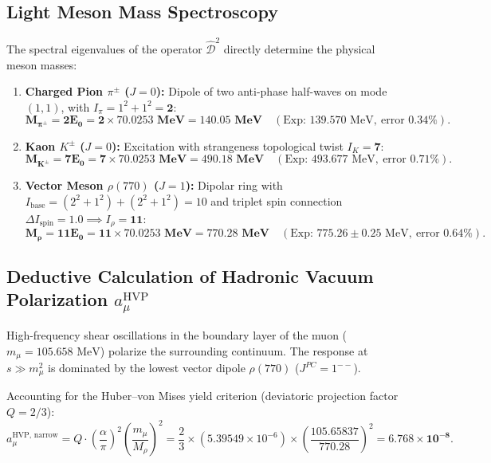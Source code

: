 \documentclass[12pt,a4paper]{article}
\begin{document}
	\subsection{Light Meson Mass Spectroscopy}
	The spectral eigenvalues of the operator $\hat{\mathcal{D}}^2$ directly determine the physical meson masses:
	\begin{enumerate}
		\item \textbf{Charged Pion $\pi^\pm$ ($J=0$):} Dipole of two anti-phase half-waves on mode $(1,1)$, with $I_\pi = 1^2 + 1^2 = \mathbf{2}$:
		\begin{equation}
			\mathbf{M_{\pi^\pm} = 2 E_0 = 2 \times 70.0253 \text{ MeV} = \mathbf{140.05 \text{ MeV}}} \quad (\text{Exp: } 139.570 \text{ MeV}, \ \text{error } 0.34\%).
		\end{equation}
		
		\item \textbf{Kaon $K^\pm$ ($J=0$):} Excitation with strangeness topological twist $I_K = \mathbf{7}$:
		\begin{equation}
			\mathbf{M_{K^\pm} = 7 E_0 = 7 \times 70.0253 \text{ MeV} = \mathbf{490.18 \text{ MeV}}} \quad (\text{Exp: } 493.677 \text{ MeV}, \ \text{error } 0.71\%).
		\end{equation}
		
		\item \textbf{Vector Meson $\rho(770)$ ($J=1$):} Dipolar ring with $I_{\text{base}} = (2^2+1^2) + (2^2+1^2) = 10$ and triplet spin connection $\Delta I_{\text{spin}} = 1.0 \implies I_\rho = \mathbf{11}$:
		\begin{equation}
			\mathbf{M_\rho = 11 E_0 = 11 \times 70.0253 \text{ MeV} = \mathbf{770.28 \text{ MeV}}} \quad (\text{Exp: } 775.26 \pm 0.25 \text{ MeV}, \ \text{error } 0.64\%).
		\end{equation}
	\end{enumerate}
	
	\subsection{Deductive Calculation of Hadronic Vacuum Polarization $a_\mu^{\text{HVP}}$}
	High-frequency shear oscillations in the boundary layer of the muon ($m_\mu = 105.658\text{ MeV}$) polarize the surrounding continuum. The response at $s \gg m_\mu^2$ is dominated by the lowest vector dipole $\rho(770)$ ($J^{PC} = 1^{--}$).
	
	Accounting for the Huber--von Mises yield criterion (deviatoric projection factor $Q = 2/3$):
	\begin{equation}
		a_\mu^{\text{HVP, narrow}} = Q \cdot \left(\frac{\alpha}{\pi}\right)^2 \left(\frac{m_\mu}{M_\rho}\right)^2 = \frac{2}{3} \times (5.39549 \times 10^{-6}) \times \left(\frac{105.65837}{770.28}\right)^2 = \mathbf{6.768 \times 10^{-8}}.
	\end{equation}
	
\end{document}
